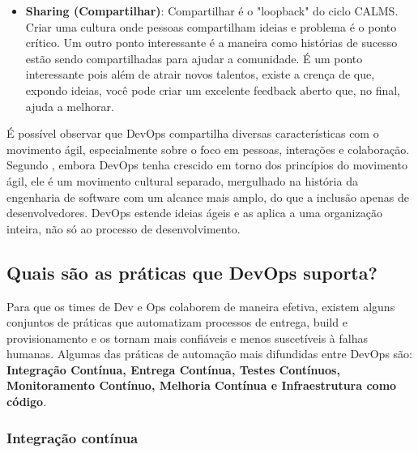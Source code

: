 \documentclass[twoside,english,brazilian]{UNISINOSartigo}
\begin{document}
\begin{itemize}
\item \textbf{Sharing (Compartilhar)}: Compartilhar é o "loopback" do ciclo CALMS. Criar uma cultura onde pessoas compartilham ideias e problema é o ponto crítico. Um outro ponto interessante é a maneira como histórias de sucesso estão sendo compartilhadas para ajudar a comunidade. É um ponto interessante pois além de atrair novos talentos, existe a crença de que, expondo ideias, você pode criar um excelente feedback aberto que, no final, ajuda a melhorar.
\end{itemize}
 
É possível observar que DevOps compartilha diversas características com o movimento ágil, especialmente sobre o foco em pessoas, interações e colaboração. Segundo , embora DevOps tenha crescido em torno dos princípios do movimento ágil, ele é um movimento cultural separado, mergulhado na história da engenharia de software com um alcance mais amplo, do que a inclusão apenas de desenvolvedores. DevOps estende ideias ágeis e as aplica a uma organização inteira, não só ao processo de desenvolvimento.  

\subsection{Quais são as práticas que DevOps suporta? }
Para que os times de Dev e Ops colaborem de maneira efetiva, existem alguns conjuntos de práticas que automatizam processos de entrega, build e provisionamento e os tornam mais confiáveis e menos suscetíveis à falhas humanas. Algumas das práticas de automação mais difundidas entre DevOps são: \textbf{Integração Contínua, Entrega Contínua, Testes Contínuos, Monitoramento Contínuo, Melhoria Contínua
e Infraestrutura como código}.

\subsubsection{Integração contínua}
\end{document}
